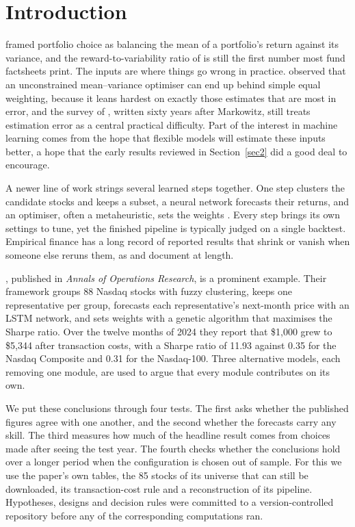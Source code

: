 
\section{Introduction}\label{sec1}

\citet{markowitz1952} framed portfolio choice as balancing the mean of a portfolio's return against its variance, and the reward-to-variability ratio of \citet{sharpe1966} is still the first number most fund factsheets print. The inputs are where things go wrong in practice. \citet{michaud1989} observed that an unconstrained mean--variance optimiser can end up behind simple equal weighting, because it leans hardest on exactly those estimates that are most in error, and the survey of \citet{kolm2014}, written sixty years after Markowitz, still treats estimation error as a central practical difficulty. Part of the interest in machine learning comes from the hope that flexible models will estimate these inputs better, a hope that the early results reviewed in Section~\ref{sec2} did a good deal to encourage.

A newer line of work strings several learned steps together. One step clusters the candidate stocks and keeps a subset, a neural network forecasts their returns, and an optimiser, often a metaheuristic, sets the weights \citep[e.g.,][]{zouaghia2025,ashrafzadeh2025}. Every step brings its own settings to tune, yet the finished pipeline is typically judged on a single backtest. Empirical finance has a long record of reported results that shrink or vanish when someone else reruns them, as \citet{harvey2016} and \citet{hou2020} document at length.

\citet{dastkhan2026}, published in \textit{Annals of Operations Research}, is a prominent example. Their framework groups 88 Nasdaq stocks with fuzzy clustering, keeps one representative per group, forecasts each representative's next-month price with an LSTM network, and sets weights with a genetic algorithm that maximises the Sharpe ratio. Over the twelve months of 2024 they report that \$1,000 grew to \$5,344 after transaction costs, with a Sharpe ratio of 11.93 against 0.35 for the Nasdaq Composite and 0.31 for the Nasdaq-100. Three alternative models, each removing one module, are used to argue that every module contributes on its own.

We put these conclusions through four tests. The first asks whether the published figures agree with one another, and the second whether the forecasts carry any skill. The third measures how much of the headline result comes from choices made after seeing the test year. The fourth checks whether the conclusions hold over a longer period when the configuration is chosen out of sample. For this we use the paper's own tables, the 85 stocks of its universe that can still be downloaded, its transaction-cost rule and a reconstruction of its pipeline. Hypotheses, designs and decision rules were committed to a version-controlled repository before any of the corresponding computations ran.

